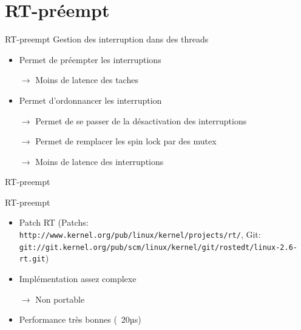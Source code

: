 \section{RT-préempt} %

\begin{frame}{RT-preempt} %
  Gestion des interruption dans des threads
  \begin{itemize}
    \item Permet de préempter les interruptions
    \item[$\to$] Moins de latence des taches
    \item Permet d'ordonnancer les interruption
    \item[$\to$] Permet de se passer de la désactivation des interruptions
    \item[$\to$] Permet de remplacer les spin lock par des mutex
    \item[$\to$] Moins de latence des interruptions
  \end{itemize}
\end{frame}

\begin{frame}{RT-preempt} 
  \begin{center}
  \end{center}
\end{frame}

\begin{frame}{RT-preempt}
 \begin{itemize}
  \item Patch RT (Patchs: \texttt{http://www.kernel.org/pub/linux/kernel/projects/rt/}, Git: \texttt{git://git.kernel.org/pub/scm/linux/kernel/git/rostedt/linux-2.6-rt.git})
  \item Implémentation assez complexe
  \item[$\to$] Non portable
  \item Performance très bonnes (~20µs)
 \end{itemize}
\end{frame}
